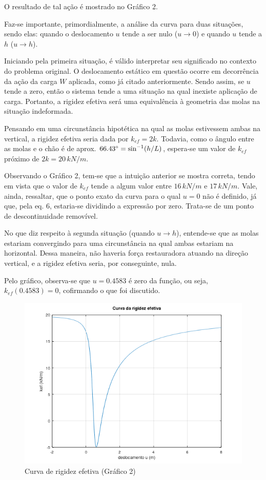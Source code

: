 \documentclass[a4paper, 12pt]{article}
\begin{document}
	O resultado de tal ação é mostrado no Gráfico 2.
	
	Faz-se importante, primordialmente, a análise da curva para duas situações, sendo elas: quando o deslocamento $u$ tende
	a ser nulo ($u\rightarrow 0$) e quando $u$ tende a $h$ ($u\rightarrow h$).
	
	Iniciando pela primeira situação, é válido interpretar seu significado no contexto do problema original. O deslocamento
	estático em questão ocorre em decorrência da ação da carga $W$ aplicada, como já citado anteriormente.  Sendo assim, se
	$u$ tende a zero, então o sistema tende a uma situação na qual inexiste aplicação de carga. Portanto, a rigidez efetiva
	será uma equivalência à geometria das molas na situação indeformada. 
	
	Pensando em uma circunstância hipotética na qual
	as molas estivessem ambas na vertical, a rigidez efetiva seria dada por $k_{ef}=2k$. Todavia, como o ângulo entre as 
	molas e o chão é de aprox. $66.43\degree =\sin ^{-1}(h/L)$, espera-se um valor de $k_{ef}$ próximo de $2k=20\,kN/m$.
	
	Observando o Gráfico 2, tem-se que a intuição anterior se mostra correta, tendo em vista que o valor de $k_{ef}$ tende
	a algum valor entre $16\,kN/m$ e $17\,kN/m$. Vale, ainda, ressaltar, que o ponto exato da curva para o qual $u=0$ não
	é definido, já que, pela eq. 6, estaria-se dividindo a expressão por zero. Trata-se de um ponto de descontinuidade 
	removível.
	
	No que diz respeito à segunda situação (quando $u\rightarrow h$), entende-se que as molas estariam convergindo para uma
	circunstância na qual ambas estariam na horizontal. Dessa maneira, não haveria força restauradora atuando na direção
	vertical, e a rigidez efetiva seria, por conseguinte, nula.
	
	Pelo gráfico, observa-se que $u=0.4583$ é zero da função, ou seja, $k_{ef}(0.4583)=0$, cofirmando o que foi discutido.
	
	\begin{figure}[!htb]
		\centering
		\includegraphics[scale=1]{g2.png}
		\caption{Curva de rigidez efetiva (Gráfico 2)}
	\end{figure}
			
\end{document}
